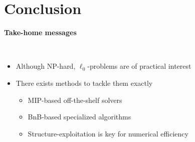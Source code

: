 \section{Conclusion}

\begin{frame}
    \begin{center}
        \Large{\textbf{Take-home messages}}
    \end{center}
    ~\\
    \begin{itemize}[label=\textbullet]
        \item Although \textcolor{TolLightOrange}{NP-hard}, $\ell_0$-problems are of \textcolor{TolLightOrange}{practical interest}
        \item There exists methods to tackle them exactly
        \begin{itemize}[label=\textbullet]
        \item \textcolor{TolLightOrange}{MIP-based} off-the-shelf solvers
        \item \textcolor{TolLightOrange}{BnB-based} specialized algorithms
        \item Structure-exploitation is key for numerical efficiency
        \end{itemize}
    \end{itemize}
\end{frame}